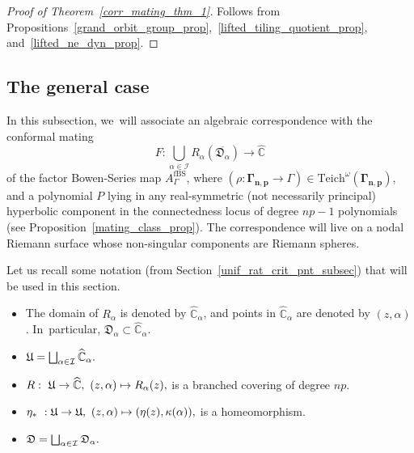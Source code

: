 \documentclass[JEP,XML,SOM,Unicode,NoFloatCountersInSection,published]{cedram}
\def\mto{\mathchoice{\longmapsto}{\mapsto}{\mapsto}{\mapsto}}
\let\oldbigsqcup\bigsqcup
\renewcommand{\bigsqcup}{\mathop{\textstyle\oldbigsqcup}\displaylimits}
\theoremstyle{definition}
\theoremstyle{remark}
\newcommand{\C}{\mathbb{C}}
\begin{document}
\begin{proof}[Proof of Theorem~\ref{corr_mating_thm_1}]
Follows from Propositions~\ref{grand_orbit_group_prop},~\ref{lifted_tiling_quotient_prop}, and~\ref{lifted_ne_dyn_prop}.
\end{proof}

\subsection{The general case}\label{gen_corr_subsec}

In this subsection, we~will associate an algebraic correspondence with the conformal mating
\[
F:\bigcup_{\alpha\in\mathcal{I}} R_\alpha(\overline{\mathfrak{D}_\alpha})\to\widehat{\C}
\]
of the factor Bowen-Series map $A_{\Gamma}^{\mathrm{fBS}}$, where $(\rho:\pmb{\Gamma_{n,p}}\to\Gamma)\in\mathrm{Teich}^\omega(\pmb{\Gamma_{n,p}})$, and a polynomial $P$ lying in any real-symmetric (not necessarily principal) hyperbolic component in the connectedness locus of degree $np-1$ polynomials (see Proposition~\ref{mating_class_prop}). The correspondence will live on a nodal Riemann surface whose non-singular components are Riemann spheres.

Let us recall some notation (from Section~\ref{unif_rat_crit_pnt_subsec}) that will be used in this section.
\begin{itemize}
\item The domain of $R_\alpha$ is denoted by $\widehat{\C}_\alpha$, and points in $\widehat{\C}_\alpha$ are denoted by $(z,\alpha)$. In~particular, $\mathfrak{D}_\alpha \subset\widehat{\C}_\alpha$.

\item $\mathfrak{U}=\bigsqcup_{\alpha\in\mathcal{I}} \widehat{\C}_{\alpha}.$

\item $R:\ \mathfrak{U}\to \widehat{\C},\ (z,\alpha)\mto R_{\alpha}(z),$ is a branched covering of degree $np$.

\item $\eta_\ast\ : \mathfrak{U}\to \mathfrak{U},\ (z,\alpha)\mto (\eta(z),\kappa(\alpha)),$ is a homeomorphism.

\item $\mathfrak{D}= \bigsqcup_{\alpha\in\mathcal{I}} \mathfrak{D}_\alpha.$
\end{itemize}
\end{document}
